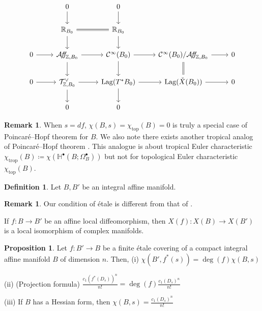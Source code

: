 \documentclass[a4paper,dvipdfmx,reqno,12pt]{amsart}
\theoremstyle{definition}
\newtheorem{Def}[Thm]{Definition}
\newtheorem{Prop}[Thm]{Proposition}
\newtheorem{Rmk}[Thm]{Remark}
\newcommand{\deq}{\coloneqq}
\newcommand{\Z}{\mathbb{Z}}%
\newcommand{\mb}[1]{\mathbb{#1}}%
\newcommand{\mcal}[1]{\mathcal{#1}}%
\newcommand{\opn}[1]{\operatorname{#1}}
\newcommand{\AffS}{{\mathop{\mcal{A}\!f\!\!f\!}\nolimits}}
\numberwithin{equation}{section}
\begin{document}
\begin{equation} \label{eq:affinecartier}
  \begin{tikzcd}
    & 0 \arrow[d]    & 0 \arrow[d]           &                      &   \\
    & \mb{R}_{B_0} \arrow[r,equal] \arrow[d]                & \mb{R}_{B_0} \arrow[d]           &                      &   \\
    0 \arrow[r] & \AffS_{\Z,B_0} \arrow[r] \arrow[d]         & \mcal{C}^{\infty}(B_0) \arrow[r] \arrow[d] & \mcal{C}^{\infty}(B_0)/\AffS_{\Z,B_0}  \arrow[r] \arrow[d,equal] & 0 \\
    0 \arrow[r] & \mcal{T}_{\Z,B_0}^{\vee} \arrow[r] \arrow[d] & \opn{Lag}(T^{*}B_0) \arrow[r] \arrow[d]  & \opn{Lag}(\check{X}(B_0)) \arrow[r]   & 0 \\
    & 0 & 0 &  &
  \end{tikzcd}
\end{equation}


\begin{Rmk}
When $s=df$, $\chi(B,s)=\chi_{\opn{top}}(B)=0$ is 
truly a special case of Poincar\'e--Hopf theorem for $B$.
We also note there exists another tropical analog of Poincar\'e--Hopf theorem
  \cite{rau2020tropical}. This analogue is about tropical Euler characteristic
  $\chi_{\opn{trop}}(B)\deq \chi(\mb{H}^{\bullet}(B;\Omega_B^{\bullet}))$
  but not for topological Euler characteristic $\chi_{\opn{top}}(B)$.
\end{Rmk}

\begin{Def}
Let $B,B'$ be an integral affine manifold.
\end{Def}

\begin{Rmk}
Our condition of \'etale is different from that of 
\cite[Definition 1.1]{grossMirrorSymmetryLogarithmic2006a}.

If $f\colon B\to B'$ be an affine local diffeomorphism,
then $X(f)\colon X(B) \to X(B')$ is a local isomorphism of
complex manifolds.
\end{Rmk}

\begin{Prop}
Let $f:B'\to B$ be a finite \'etale covering of a compact integral affine 
manifold $B$ of dimension $n$. Then,
(i) $\chi(B',f^{*}(s))=\opn{deg}(f)\chi(B,s)$

(ii) (Projection formula) 
$\frac{c_1(f^{*}(D_s))^{n}}{n!}=\opn{deg}(f)\frac{c_1(D_s)^{n}}{n!}$

(iii) If $B$ has a Hessian form, then $\chi(B,s)=\frac{c_1(D_s)^{n}}{n!}$
\end{Prop}
\end{document}
